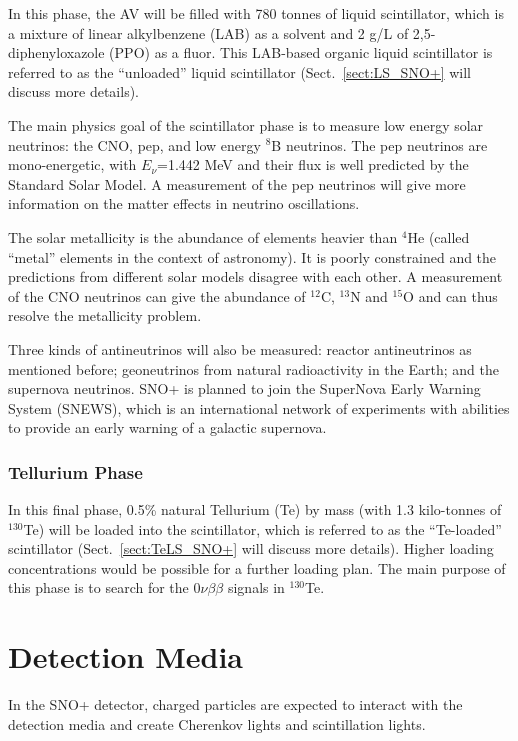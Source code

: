 In this phase, the AV will be filled with 780 tonnes of liquid scintillator, which is a mixture of linear alkylbenzene (LAB) as a solvent and 2 g/L of 2,5-diphenyloxazole (PPO) as a fluor. This LAB-based organic liquid scintillator is referred to as the ``unloaded'' liquid scintillator (Sect.~\ref{sect:LS_SNO+} will discuss more details).

The main physics goal of the scintillator phase is to measure low energy solar neutrinos: the CNO, pep, and low energy $^8$B neutrinos. The pep neutrinos are mono-energetic, with $E_\nu$=1.442 MeV and their flux is well predicted by the Standard Solar Model\cite{davini2016cno}. A measurement of the pep neutrinos will give more information on the matter effects in neutrino oscillations. 

The solar metallicity is the abundance of elements heavier than $^4$He (called ``metal'' elements in the context of astronomy). It is poorly constrained and the predictions from different solar models disagree with each other. A measurement of the CNO neutrinos can give the abundance of $^{12}$C, $^{13}$N and $^{15}$O and can thus resolve the metallicity problem\cite{cerdeno2018cno}.

Three kinds of antineutrinos will also be measured: reactor antineutrinos as mentioned before; geoneutrinos from natural radioactivity in the Earth; and the supernova neutrinos. SNO+ is planned to join the SuperNova Early Warning System (SNEWS), which is an international network of experiments with abilities to provide an early warning of a galactic supernova\cite{snop_jinst}.

\subsubsection{Tellurium Phase} \label{sect:tePhase}
In this final phase, 0.5\% natural Tellurium (Te) by mass (with 1.3 kilo-tonnes of $^{130}$Te) will be loaded into the scintillator, which is referred to as the ``Te-loaded'' scintillator (Sect.~\ref{sect:TeLS_SNO+} will discuss more details). Higher loading concentrations would be possible for a further loading plan\cite{Paton:2019kgy}. The main purpose of this phase is to search for the $0\nu\beta\beta$ signals in $^{130}$Te.

\section{Detection Media} \label{sect:detectionMedia}
In the SNO+ detector, charged particles are expected to interact with the detection media and create Cherenkov lights and scintillation lights. 

